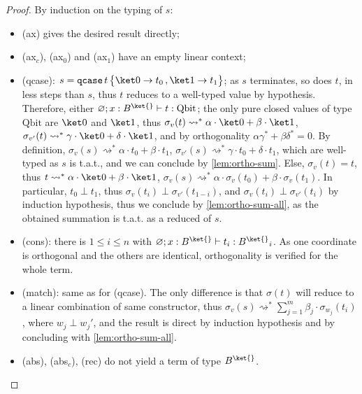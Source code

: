 \documentclass[10pt,a4paper]{article}
\newcommand{\bvar}{B}
\newcommand\bkvar{\bvar^{\ket{}}}
\newcommand{\bkvarb}{{\bkvar}}
\newcommand{\qbit}{\mathrm{Qbit}}
\newcommand{\textqcase}{\ensuremath{\mathtt{qcase}}}
\newcommand{\zket}{\ket 0}
\newcommand{\oket}{\ket 1}
\newcommand{\qcasebase}[2]{
  \textqcase\,#1\left\{\! \begin{aligned} #2 \end{aligned}\right\}
}
\newcommand{\qcase}[3]{
  \qcasebase {#1} {\zket \to #2\,, \oket \to #3}
}
\newcommand{\qcasedefault}[1]{\ensuremath{\qcase{#1}{t_0}{t_1}}}
\newcommand{\vartyping}[2]{#1 : #2}
\newcommand{\typing}[4]{
  \ifx&#1&\varnothing \else #1\fi; 
  \ifx&#2&\varnothing \else #2\fi 
  \vdash {#3} : #4
}
\newcommand{\reduces}{\rightsquigarrow}
\newcommand{\sreduces}{\reduces^*}
\begin{document}
\begin{proof}
  By induction on the typing of $s$:
  \begin{itemize}
    \item (ax) gives the desired result directly;

    \item (ax$_c$), (ax$_0$) and (ax$_1$) have an empty linear context;

    \item (qcase): $s = \qcasedefault t$; as $s$ terminates,
      so does $t$, in less steps than $s$, thus $t$ reduces to a well-typed
      value by hypothesis. Therefore,
      either $\typing {} {\vartyping x \bkvar} t \qbit$;
      the only pure closed values of type $\qbit$ are $\zket$ and $\oket$, thus
      $\sigma_v(t) \sreduces \alpha \cdot \zket + \beta \cdot \oket$,
      $\sigma_{v'}(t) \sreduces \gamma \cdot \zket + \delta \cdot \oket$,
      and by orthogonality $\alpha\gamma^* + \beta\delta^*  = 0$.
      By definition, $\sigma_v(s) \sreduces \alpha \cdot t_0 + \beta \cdot t_1$,
      $\sigma_{v'}(s) \sreduces \gamma \cdot t_0 + \delta \cdot t_1$,
      which are well-typed as $s$ is t.a.t.,
      and we can conclude by \autoref{lem:ortho-sum}.
      Else, $\sigma_v(t) = t$, thus $t \sreduces \alpha \cdot \zket +
      \beta \cdot \oket$,
      $\sigma_v(s) \sreduces \alpha \cdot \sigma_v(t_0) + \beta \cdot
      \sigma_v(t_1)$.
      In particular, $t_0 \perp t_1$, thus $\sigma_v(t_i) \perp
      \sigma_{v'}(t_{1-i})$,
      and $\sigma_v(t_i) \perp \sigma_{v'}(t_i)$ by induction
      hypothesis, thus we conclude by \autoref{lem:ortho-sum-all},
      as the obtained summation is t.a.t. as a reduced of $s$.

    \item (cons): there is $1 \leq i \leq n$ with $\typing {}
      {\vartyping x \bkvar} {t_i} \bkvarb_i$.
      As one coordinate is orthogonal and the others are identical,
      orthogonality is verified for the whole term.

    \item (match): same as for (qcase). The only difference is that
      $\sigma(t)$ will reduce to a linear combination of same
      constructor, thus $\sigma_v(s) \sreduces \sum_{j=1}^m \beta_j
      \cdot \sigma_{w_j}(t_i)$,
      where $w_j \perp w_j'$, and the result is direct by induction hypothesis
      and by concluding with \autoref{lem:ortho-sum-all}.

    \item (abs), (abs$_c$), (rec) do not yield a term of type $\bkvar$.


\end{itemize}
\end{proof}
\end{document}
